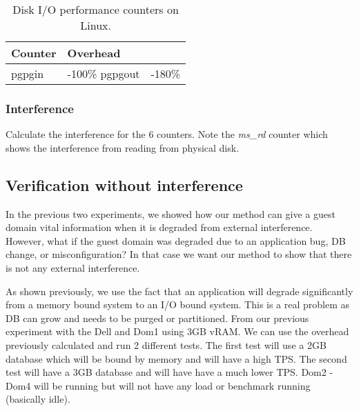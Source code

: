 \begin{table}[h]
\begin{tabular}{ l l p{5cm} }
  Counter & Overhead \\
  \hline
  pgpgin & -100\%
  pgpgout & -180\%

  \hline
\end{tabular}
\caption{Disk I/O performance counters on Linux.}

\subsubsection{Interference}
Calculate the interference for the 6 counters.  Note the \emph{ms\_rd} counter which shows the interference from reading from physical disk.


\subsection{Verification without interference}
In the previous two experiments, we showed how our method can give a guest domain vital information when it is degraded from external interference.  However, what if the guest domain was degraded due to an application bug, DB change, or misconfiguration?   In that case we want our method to show that there is not any external interference.

\indent As shown previously, we use the fact that an application will degrade significantly from a memory bound system to an I/O bound system.  This is a real problem as DB can grow and needs to be purged or partitioned.  From our previous experiment with the Dell and Dom1 using 3GB vRAM.  We can use the overhead previously calculated and run 2 different tests.  The first test will use a 2GB database which will be bound by memory and will have a high TPS. The second test will have a 3GB database and will have have a much lower TPS.  Dom2 - Dom4 will be running but will not have any load or benchmark running (basically idle).








\begin{comment}
\begin{table}[h]
\begin{tabular}{ l l p{5cm} }
  Statistics & Description \\
  \hline
  /proc/diskstat & I/O statistics of block devices \\
  /proc/vmstat & Detailed virtual memory statistics\\
  \hline
\end{tabular}
\caption{Disk I/O performance counters on Linux.}
\label{tab:iocounters}
\end{table}


\end{comment}
\end{table}
